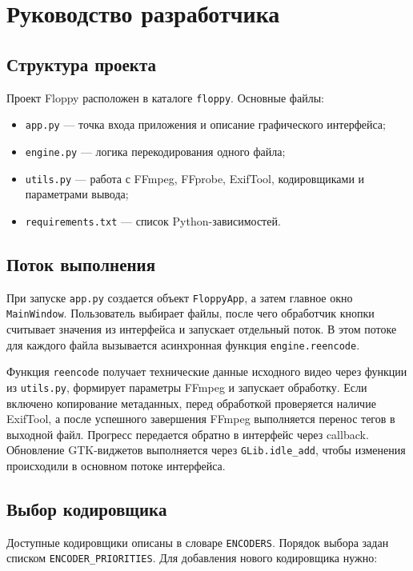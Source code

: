 \documentclass[14pt,a4paper]{extarticle}
\begin{document}
\section{Руководство разработчика}

\subsection{Структура проекта}

Проект Floppy расположен в каталоге \texttt{floppy}. Основные файлы:

\begin{itemize}
	\item \texttt{app.py} --- точка входа приложения и описание графического интерфейса;
	\item \texttt{engine.py} --- логика перекодирования одного файла;
	\item \texttt{utils.py} --- работа с FFmpeg, FFprobe, ExifTool, кодировщиками и параметрами вывода;
	\item \texttt{requirements.txt} --- список Python-зависимостей.
\end{itemize}

\subsection{Поток выполнения}

При запуске \texttt{app.py} создается объект \texttt{FloppyApp}, а затем главное окно \texttt{MainWindow}. Пользователь выбирает файлы, после чего обработчик кнопки считывает значения из интерфейса и запускает отдельный поток. В этом потоке для каждого файла вызывается асинхронная функция \texttt{engine.reencode}.

Функция \texttt{reencode} получает технические данные исходного видео через функции из \texttt{utils.py}, формирует параметры FFmpeg и запускает обработку. Если включено копирование метаданных, перед обработкой проверяется наличие ExifTool, а после успешного завершения FFmpeg выполняется перенос тегов в выходной файл. Прогресс передается обратно в интерфейс через callback. Обновление GTK-виджетов выполняется через \texttt{GLib.idle\_add}, чтобы изменения происходили в основном потоке интерфейса.

\subsection{Выбор кодировщика}

Доступные кодировщики описаны в словаре \texttt{ENCODERS}. Порядок выбора задан списком \texttt{ENCODER\_PRIORITIES}. Для добавления нового кодировщика нужно:
\end{document}
